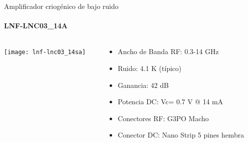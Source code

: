 \documentclass[ignorenonframetext,12pt]{beamer}
\begin{document}
				\begin{frame}{Amplificador criog\'enico de bajo ruido}
								\framesubtitle{LNF-LNC03\_14A}
								\begin{columns}
												\begin{column}{0.40\textwidth}
																\hspace{10mm}\texttt{[image: lnf-lnc03\_14sa]}
												\end{column}
												\begin{column}{0.60\textwidth}
																\begin{itemize}
																				\item Ancho de Banda RF: 0.3-14 GHz
																				\item Ruido: 4.1 K (típico)
																				\item Ganancia: 42 dB
																				\item Potencia DC: Vc= 0.7 V @ 14 mA
																				\item Conectores RF: G3PO Macho
																				\item Conector DC: Nano Strip 5 pines hembra
																\end{itemize}
												\end{column}
								\end{columns}
				\end{frame}
\end{document}
